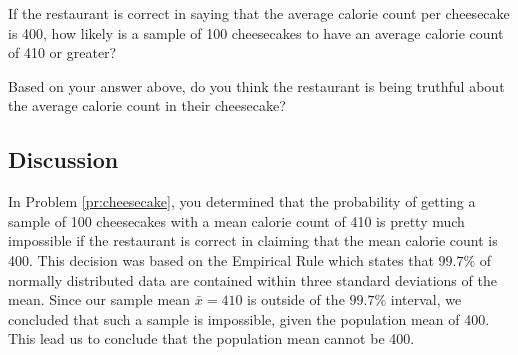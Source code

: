 \documentclass{ximera}
\begin{document}
\begin{problem}
\begin{question}
If the restaurant is correct in saying that the average calorie count per cheesecake is 400, how likely is a sample of 100 cheesecakes to have an average calorie count of 410 or greater?
\begin{multipleChoice}
\end{multipleChoice}
\end{question}
\begin{question}
Based on your answer above, do you think the restaurant is being truthful about the average calorie count in their cheesecake?
\begin{multipleChoice}
\end{multipleChoice}
\end{question}

\end{problem}

\subsection{Discussion}  In Problem \ref{pr:cheesecake}, you determined that the probability of getting a sample of 100 cheesecakes with a mean calorie count of 410 is pretty much impossible if the restaurant is correct in claiming that the mean calorie count is 400.  This decision was based on the Empirical Rule which states that $99.7\%$ of normally distributed data are contained within three standard deviations of the mean.  Since our sample mean $\bar{x}=410$ is outside of the $99.7\%$ interval, we concluded that such a sample is impossible, given the population mean of 400.  This lead us to conclude that the population mean cannot be 400. 
\end{document}
